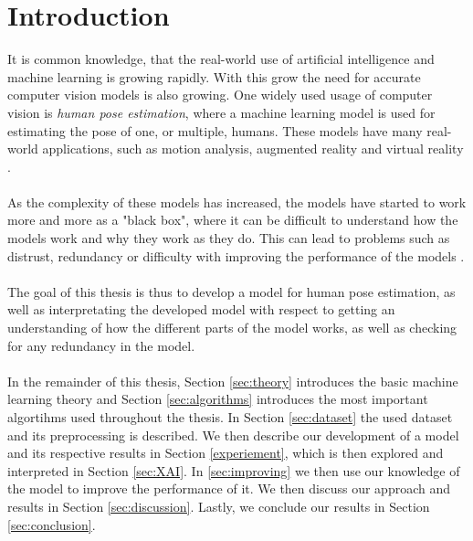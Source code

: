 \documentclass[./main.tex]{subfiles}
\begin{document}
\section{Introduction}
It is common knowledge, that the real-world use of artificial intelligence and machine learning is growing rapidly. With this grow the need for accurate computer vision models is also growing. One widely used usage of computer vision is \textit{human pose estimation}, where a machine learning model is used for estimating the pose of one, or multiple, humans. These models have many real-world applications, such as motion analysis, augmented reality and virtual reality \cite{survey_2}.
\\
\\
As the complexity of these models has increased, the models have started to work more and more as a "black box", where it can be difficult to understand how the models work and why they work as they do. This can lead to problems such as distrust, redundancy or difficulty with improving the performance of the models \cite{Selvaraju}.
\\
\\
The goal of this thesis is thus to develop a model for human pose estimation, as well as interpretating the developed model with respect to getting an understanding of how the different parts of the model works, as well as checking for any redundancy in the model.
\\
\\
In the remainder of this thesis, Section \ref{sec:theory} introduces the basic machine learning theory and Section \ref{sec:algorithms} introduces the most important algortihms used throughout the thesis. In Section \ref{sec:dataset} the used dataset and its preprocessing is described. We then describe our development of a model and its respective results in Section \ref{experiement}, which is then explored and interpreted in Section \ref{sec:XAI}. In \ref{sec:improving} we then use our knowledge of the model to improve the performance of it. We then discuss our approach and results in Section \ref{sec:discussion}. Lastly, we conclude our results in Section \ref{sec:conclusion}.
\end{document}
